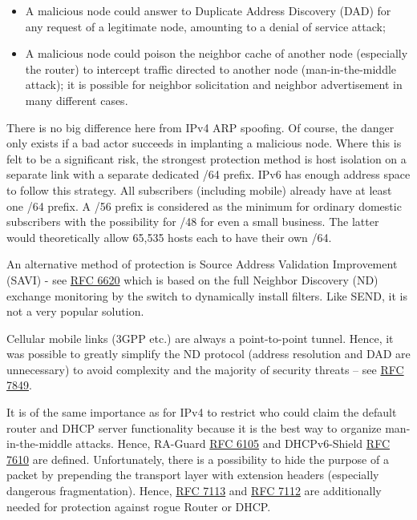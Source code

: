 \documentclass[
]{article}
\providecommand{\tightlist}{%
  \setlength{\itemsep}{0pt}\setlength{\parskip}{0pt}}
\begin{document}
\begin{itemize}
\tightlist
\item
  A malicious node could answer to Duplicate Address Discovery (DAD) for
  any request of a legitimate node, amounting to a denial of service
  attack;
\item
  A malicious node could poison the neighbor cache of another node
  (especially the router) to intercept traffic directed to another node
  (man-in-the-middle attack); it is possible for neighbor solicitation
  and neighbor advertisement in many different cases.
\end{itemize}

There is no big difference here from IPv4 ARP spoofing. Of course, the
danger only exists if a bad actor succeeds in implanting a malicious
node. Where this is felt to be a significant risk, the strongest
protection method is host isolation on a separate link with a separate
dedicated /64 prefix. IPv6 has enough address space to follow this
strategy. All subscribers (including mobile) already have at least one
/64 prefix. A /56 prefix is considered as the minimum for ordinary
domestic subscribers with the possibility for /48 for even a small
business. The latter would theoretically allow 65,535 hosts each to have
their own /64.

An alternative method of protection is Source Address Validation
Improvement (SAVI) - see
\href{https://www.rfc-editor.org/info/rfc6620}{RFC 6620} which is based
on the full Neighbor Discovery (ND) exchange monitoring by the switch to
dynamically install filters. Like SEND, it is not a very popular
solution.

Cellular mobile links (3GPP etc.) are always a point-to-point tunnel.
Hence, it was possible to greatly simplify the ND protocol (address
resolution and DAD are unnecessary) to avoid complexity and the majority
of security threats -- see
\href{https://www.rfc-editor.org/info/rfc7849}{RFC 7849}.

It is of the same importance as for IPv4 to restrict who could claim the
default router and DHCP server functionality because it is the best way
to organize man-in-the-middle attacks. Hence, RA-Guard
\href{https://www.rfc-editor.org/info/rfc6105}{RFC 6105} and
DHCPv6-Shield \href{https://www.rfc-editor.org/info/rfc7610}{RFC 7610}
are defined. Unfortunately, there is a possibility to hide the purpose
of a packet by prepending the transport layer with extension headers
(especially dangerous fragmentation). Hence,
\href{https://www.rfc-editor.org/info/rfc7113}{RFC 7113} and
\href{https://www.rfc-editor.org/info/rfc7112}{RFC 7112} are
additionally needed for protection against rogue Router or DHCP.
\end{document}
